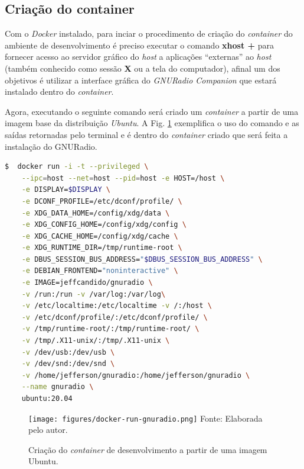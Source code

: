 \documentclass[
  12pt,				%
  openright,			%
  twoside,			%
  a4paper,			%
  english,			%
  french,				%
  spanish,			%
  brazil,				%
  ]{abntex2}
\begin{document}
\subsection*{Criação do container}

Com o \textit{Docker} instalado, para inciar o procedimento de criação do \textit{container} do ambiente de desenvolvimento é preciso executar o comando \textbf{xhost +}
para fornecer acesso ao servidor gráfico do \textit{host} a aplicações “externas” ao \textit{host} (também conhecido como sessão \textbf{X} ou a tela do computador),
afinal um dos objetivos é utilizar a interface gráfica do \textit{GNURadio Companion} que estará instalado dentro do \textit{container}.

Agora, executando o seguinte comando será criado um \textit{container} a partir de uma imagem base da distribuição \textit{Ubuntu}. A Fig.
\ref{fig:docker-run-gnuradio} exemplifica o uso do comando e as saídas retornadas pelo terminal e é dentro do \textit{container}
criado que será feita a instalação do GNURadio.

\begin{adjustbox}{max width=\linewidth}
  \begin{lstlisting}[language=bash]
$  docker run -i -t --privileged \
    --ipc=host --net=host --pid=host -e HOST=/host \
    -e DISPLAY=$DISPLAY \
    -e DCONF_PROFILE=/etc/dconf/profile/ \
    -e XDG_DATA_HOME=/config/xdg/data \
    -e XDG_CONFIG_HOME=/config/xdg/config \
    -e XDG_CACHE_HOME=/config/xdg/cache \
    -e XDG_RUNTIME_DIR=/tmp/runtime-root \
    -e DBUS_SESSION_BUS_ADDRESS="$DBUS_SESSION_BUS_ADDRESS" \
    -e DEBIAN_FRONTEND="noninteractive" \
    -e IMAGE=jeffcandido/gnuradio \
    -v /run:/run -v /var/log:/var/log\
    -v /etc/localtime:/etc/localtime -v /:/host \
    -v /etc/dconf/profile/:/etc/dconf/profile/ \
    -v /tmp/runtime-root/:/tmp/runtime-root/ \
    -v /tmp/.X11-unix/:/tmp/.X11-unix \
    -v /dev/usb:/dev/usb \
    -v /dev/snd:/dev/snd \
    -v /home/jefferson/gnuradio:/home/jefferson/gnuradio \
    --name gnuradio \
    ubuntu:20.04
  \end{lstlisting}
\end{adjustbox}


\begin{figure}[!htb]
  \centering
  \caption{Criação do \textit{container} de desenvolvimento a partir de uma imagem Ubuntu.}
  \texttt{[image: figures/docker-run-gnuradio.png]}
  Fonte: Elaborada pelo autor.
  \label{fig:docker-run-gnuradio}
\end{figure}
\end{document}
